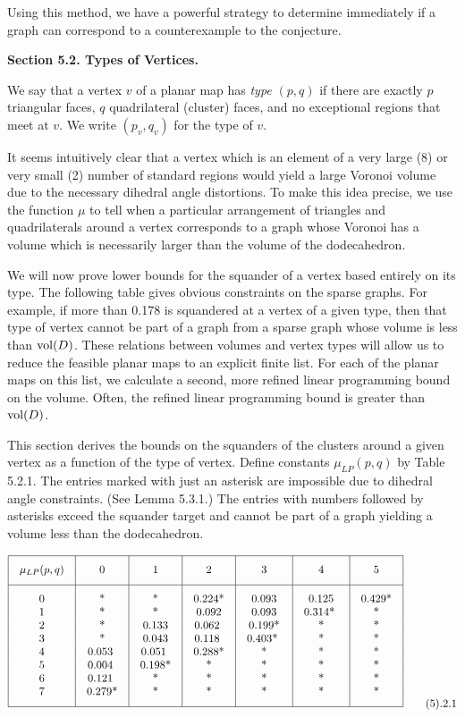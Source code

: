 Using this method, we have a powerful strategy to determine immediately if a graph 
can correspond to a counterexample to the conjecture.  

\bigskip

{\bf Section 5.2. Types of Vertices.}

\bigskip 

We say that a vertex $v$ of a planar map has {\it type} $(p,q)$ if there are exactly $p$ triangular faces, $q$ quadrilateral (cluster) faces, and no exceptional regions that meet at $v$.  We write $(p_v,q_v)$ for the type of $v$.  


It seems intuitively clear that a vertex which is an element of a very large 
(8) or very small (2) number of standard regions would yield a large Voronoi volume due to the necessary dihedral angle distortions.  To make this idea precise, we use the function $\mu$ to tell when a particular arrangement of triangles and quadrilaterals around a vertex corresponds to a graph whose Voronoi has a volume which is necessarily larger than the volume of the dodecahedron.  

We will now prove lower bounds for the squander of a vertex based entirely on its type.  The following table gives obvious constraints on the sparse graphs.  For example, if more than 0.178 is squandered at a vertex of a given type, then that type of vertex cannot be part of a graph from a sparse graph whose volume is less than $\operatorname{vol}(D)$.  These relations between volumes and vertex types will allow us to reduce the feasible planar maps to an explicit finite list.  For each of the planar maps on this list, we calculate a second, more refined linear programming bound on the volume.  Often, the refined linear programming bound is greater than $\operatorname{vol}(D)$.  

This section derives the bounds on the squanders of the clusters around a given vertex as a function of the type of vertex.  Define constants $\mu_{LP} (p,q)$ by Table 5.2.1.  The entries marked with just an asterisk are impossible due to dihedral angle constraints.  
(See Lemma 5.3.1.)
The entries with numbers followed by asterisks exceed  the squander target and cannot be part of a graph yielding a volume less than the dodecahedron.


$$
\vbox{\offinterlineskip
\hrule
\halign{&\vrule#&\strut\quad\hfil#\hfil\quad\cr
height 7pt&\omit&&\omit&&\omit&&\omit&&\omit&&\omit&&\omit&\cr
&\hfil $\mu_{LP} (p,q)$\hfil
        &&\hfil0\hfil
        &&\hfil1\hfil
        &&\hfil2\hfil
        &&\hfil3\hfil
        &&\hfil4\hfil
        &&\hfil5\hfil&
\cr
height 7pt&\omit&&\omit&&\omit&&\omit&&\omit&&\omit&&\omit&\cr
\noalign{\hrule}
height7pt&\omit&&\omit&&\omit&&\omit&&\omit&&\omit&&\omit&\cr
&0&&	*&&	*&&	0.224*&&  0.093&& 0.125&& 0.429*&\cr
&1&&	*&& *&&  0.092&& 0.093&& 0.314* && *&\cr
&2&&	*&& 0.133&& 0.062 && 0.199*&& *&&*&\cr
&3&&	*&& 0.043&& 0.118 && 0.403* &&*&&*&\cr
&4&& 0.053 && 0.051 && 0.288*&&*&&*&&*&\cr
&5&& 0.004 && 0.198*&&*&&*&&*&&*&\cr
&6&& 0.121 &&*&&*&&*&&*&&*&\cr
&7&& 0.279*&&*&&*&&*&&*&&*&\cr
height7pt&\omit&&\omit&&\omit&&\omit&&\omit&&\omit&&\omit&\cr}
\hrule
}\tag 5.2.1
$$


